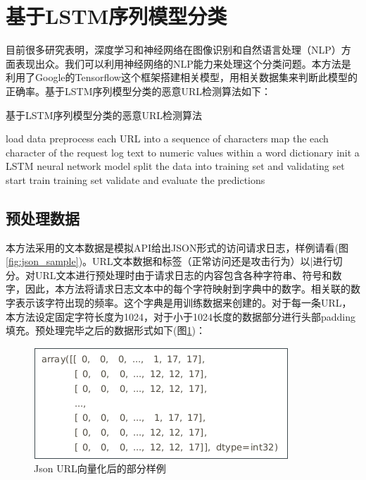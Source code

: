 \section{基于LSTM序列模型分类}
目前很多研究表明，深度学习和神经网络在图像识别和自然语言处理（NLP）方面表现出众。我们可以利用神经网络的NLP能力来处理这个分类问题。本方法是利用了Google的Tensorflow这个框架搭建相关模型，用相关数据集来判断此模型的正确率。基于LSTM序列模型分类的恶意URL检测算法如下：
\begin{algorithm}[!ht]
    \SetAlgoNoLine
    \caption{基于LSTM序列模型分类的恶意URL检测算法}
    load data\; 
    preprocess each URL into a sequence of characters\;
    map the each character of the request log text to numeric values within a word dictionary\;
    init a LSTM neural network model\;
    split the data into training set and validating set\;
    start train training set\;
    validate and evaluate the predictions\;
\end{algorithm}
\subsection{预处理数据}
本方法\cite{Sui2010Content}采用\cite{Zhang2013DTU}的文本数据是模拟API给出JSON形式的访问请求日志，样例请看(图\ref{fig:json_sample})。URL文本数据和标签（正常访问还是攻击行为）以|进行切分。对URL文本进行预处理时由于请求日志的内容包含各种字符串、符号和数字，因此，本方法将请求日志文本中的每个字符映射到字典中的数字。相关联的数字表示该字符出现的频率。这个字典是用训练数据来创建的。对于每一条URL，本方法设定固定字符长度为1024，对于小于1024长度的数据部分进行头部padding填充。预处理完毕之后的数据形式如下(图\ref{fig:vec2})：
\begin{figure}[!ht]
    \setlength{\abovecaptionskip}{0.cm}
    \setlength{\belowcaptionskip}{-0.cm}
    \centering
     \includegraphics[scale=0.5]{Figs/vec2.png}
    \caption{Json URL向量化后的部分样例}
    \label{fig:vec2}
\end{figure}
